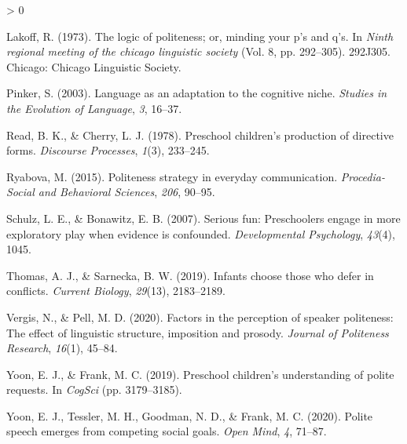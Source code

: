 \documentclass[
  english,
  man,floatsintext]{apa6}
\newlength{\cslhangindent}
\newenvironment{CSLReferences}[2] %
 {%
  \setlength{\parindent}{0pt}
  \ifodd #1 \everypar{\setlength{\hangindent}{\cslhangindent}}\ignorespaces\fi
  \ifnum #2 > 0
  \setlength{\parskip}{#2\baselineskip}
  \fi
 }%
 {}
\begin{document}
\begin{CSLReferences}{1}{0}
\leavevmode\hypertarget{ref-lakoff1973}{}%
Lakoff, R. (1973). The logic of politeness; or, minding your p's and q's. In \emph{Ninth regional meeting of the chicago linguistic society} (Vol. 8, pp. 292--305). 292J305. Chicago: Chicago Linguistic Society.

\leavevmode\hypertarget{ref-pinker2003}{}%
Pinker, S. (2003). Language as an adaptation to the cognitive niche. \emph{Studies in the Evolution of Language}, \emph{3}, 16--37.

\leavevmode\hypertarget{ref-read1978}{}%
Read, B. K., \& Cherry, L. J. (1978). Preschool children's production of directive forms. \emph{Discourse Processes}, \emph{1}(3), 233--245.

\leavevmode\hypertarget{ref-ryabova2015}{}%
Ryabova, M. (2015). Politeness strategy in everyday communication. \emph{Procedia-Social and Behavioral Sciences}, \emph{206}, 90--95.

\leavevmode\hypertarget{ref-schulz2007}{}%
Schulz, L. E., \& Bonawitz, E. B. (2007). Serious fun: Preschoolers engage in more exploratory play when evidence is confounded. \emph{Developmental Psychology}, \emph{43}(4), 1045.

\leavevmode\hypertarget{ref-thomas2019}{}%
Thomas, A. J., \& Sarnecka, B. W. (2019). Infants choose those who defer in conflicts. \emph{Current Biology}, \emph{29}(13), 2183--2189.

\leavevmode\hypertarget{ref-vergis2020}{}%
Vergis, N., \& Pell, M. D. (2020). Factors in the perception of speaker politeness: The effect of linguistic structure, imposition and prosody. \emph{Journal of Politeness Research}, \emph{16}(1), 45--84.

\leavevmode\hypertarget{ref-yoon2019}{}%
Yoon, E. J., \& Frank, M. C. (2019). Preschool children's understanding of polite requests. In \emph{CogSci} (pp. 3179--3185).

\leavevmode\hypertarget{ref-yoon2020}{}%
Yoon, E. J., Tessler, M. H., Goodman, N. D., \& Frank, M. C. (2020). Polite speech emerges from competing social goals. \emph{Open Mind}, \emph{4}, 71--87.

\end{CSLReferences}

\endgroup
\end{document}
